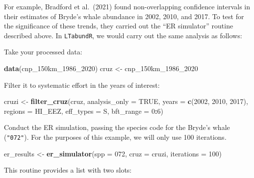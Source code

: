 \documentclass[
]{book}
\newenvironment{Shaded}{\begin{snugshade}}{\end{snugshade}}
\newcommand{\AttributeTok}[1]{\textcolor[rgb]{0.13,0.29,0.53}{#1}}
\newcommand{\ConstantTok}[1]{\textcolor[rgb]{0.56,0.35,0.01}{#1}}
\newcommand{\DecValTok}[1]{\textcolor[rgb]{0.00,0.00,0.81}{#1}}
\newcommand{\FunctionTok}[1]{\textcolor[rgb]{0.13,0.29,0.53}{\textbf{#1}}}
\newcommand{\NormalTok}[1]{#1}
\newcommand{\OtherTok}[1]{\textcolor[rgb]{0.56,0.35,0.01}{#1}}
\newcommand{\SpecialCharTok}[1]{\textcolor[rgb]{0.81,0.36,0.00}{\textbf{#1}}}
\newcommand{\StringTok}[1]{\textcolor[rgb]{0.31,0.60,0.02}{#1}}
\begin{document}
For example, Bradford et al.~(2021) found non-overlapping confidence intervals in their estimates of Bryde's whale abundance in 2002, 2010, and 2017. To test for the significance of these trends, they carried out the ``ER simulator'' routine described above. In \texttt{LTabundR}, we would carry out the same analysis as follows:

Take your processed data:

\begin{Shaded}
\begin{Highlighting}[]
\FunctionTok{data}\NormalTok{(cnp\_150km\_1986\_2020)}
\NormalTok{cruz }\OtherTok{\textless{}{-}}\NormalTok{ cnp\_150km\_1986\_2020}
\end{Highlighting}
\end{Shaded}

Filter it to systematic effort in the years of interest:

\begin{Shaded}
\begin{Highlighting}[]
\NormalTok{cruzi }\OtherTok{\textless{}{-}} 
  \FunctionTok{filter\_cruz}\NormalTok{(cruz,}
              \AttributeTok{analysis\_only =} \ConstantTok{TRUE}\NormalTok{,}
              \AttributeTok{years =} \FunctionTok{c}\NormalTok{(}\DecValTok{2002}\NormalTok{, }\DecValTok{2010}\NormalTok{, }\DecValTok{2017}\NormalTok{),}
              \AttributeTok{regions =} \StringTok{\textquotesingle{}HI\_EEZ\textquotesingle{}}\NormalTok{,}
              \AttributeTok{eff\_types =} \StringTok{\textquotesingle{}S\textquotesingle{}}\NormalTok{,}
              \AttributeTok{bft\_range =} \DecValTok{0}\SpecialCharTok{:}\DecValTok{6}\NormalTok{)}
\end{Highlighting}
\end{Shaded}

Conduct the ER simulation, passing the species code for the Bryde's whale (\texttt{"072"}). For the purposes of this example, we will only use 100 iterations.

\begin{Shaded}
\begin{Highlighting}[]
\NormalTok{er\_results }\OtherTok{\textless{}{-}} 
  \FunctionTok{er\_simulator}\NormalTok{(}\AttributeTok{spp =} \StringTok{\textquotesingle{}072\textquotesingle{}}\NormalTok{, }\AttributeTok{cruz =}\NormalTok{ cruzi, }\AttributeTok{iterations =} \DecValTok{100}\NormalTok{)}
\end{Highlighting}
\end{Shaded}

This routine provides a list with two slots:
\end{document}
